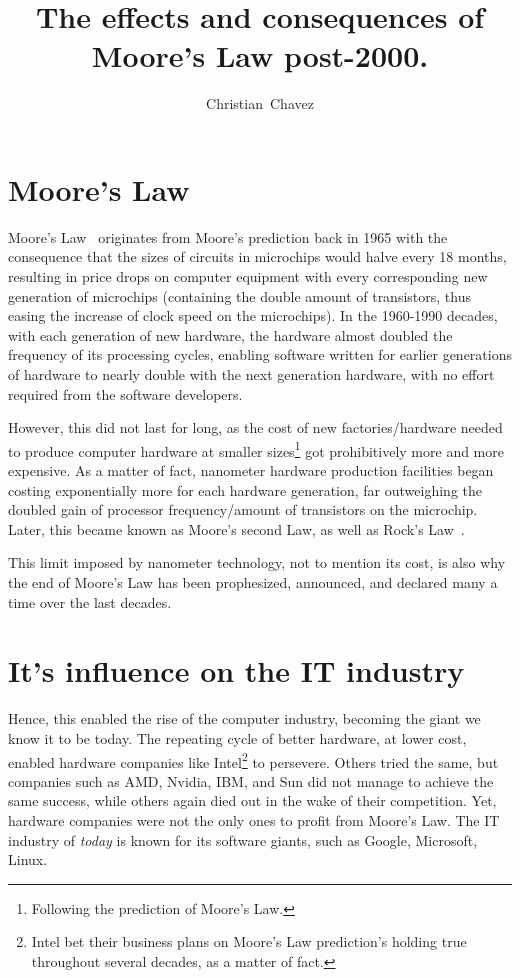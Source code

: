 \documentclass[a4paper,12pt]{article}
\begin{document}
\title{The effects and consequences of Moore's Law post-2000.}
\author{Christian~Chavez}

\maketitle

\section*{Moore's Law}

Moore's Law~\cite{Moore:2000:CMC:333067.333074} originates from Moore's prediction back in 1965 with the consequence that the sizes of circuits in microchips would halve every 18 months, resulting in price drops on computer equipment with every corresponding new generation of microchips (containing the double amount of transistors, thus easing the increase of clock speed on the microchips).
In the 1960-1990 decades, with each generation of new hardware, the hardware almost doubled the frequency of its processing cycles, enabling software written for earlier generations of hardware to nearly double with the next generation hardware, with no effort required from the software developers.

However, this did not last for long, as the cost of new factories/hardware needed to produce computer hardware at smaller sizes\footnote{Following the prediction of Moore's Law.} got prohibitively more and more expensive.
As a matter of fact, nanometer hardware production facilities began costing exponentially more for each hardware generation, far outweighing the doubled gain of processor frequency/amount of transistors on the microchip.
Later, this became known as Moore's second Law, as well as Rock's Law~\cite{Ross:2003:EC:965307.965316}.

This limit imposed by nanometer technology, not to mention its cost, is also why the end of Moore's Law has been prophesized, announced, and declared many a time over the last decades.

\section*{It's influence on the IT industry}

Hence, this enabled the rise of the computer industry, becoming the giant we know it to be today.
The repeating cycle of better hardware, at lower cost, enabled hardware companies like Intel\footnote{Intel bet their business plans on Moore's Law prediction's holding true throughout several decades, as a matter of fact\cite{IntelMoore'sLawIn10nm,Moore40,Moore50}.} to persevere.
Others tried the same, but companies such as AMD, Nvidia, IBM, and Sun did not manage to achieve the same success, while others again died out in the wake of their competition.
Yet, hardware companies were not the only ones to profit from Moore's Law.
The IT industry of \emph{today} is known for its software giants, such as Google, Microsoft, Linux.
\end{document}
